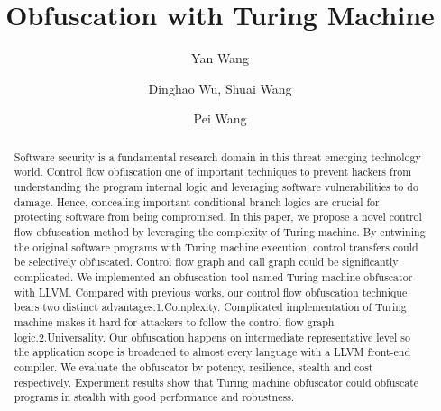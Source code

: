 \documentclass[lnicst]{svmultln}
\begin{document}
%
\mainmatter              %
%
\title{Obfuscation with Turing Machine}
%
%
\author{Yan Wang \and Dinghao Wu,
Shuai Wang \and Pei Wang}
%
%
%
\institute{Pennsylvania State University, State College,PA 16801, USA,\\
\email{ybw5084@ist.psu.edu} %
}
\maketitle              

\begin{abstract}        %
Software security is a fundamental research domain in this threat emerging technology world. Control flow obfuscation one of important techniques to prevent hackers from understanding the program internal logic and leveraging software vulnerabilities to do damage. Hence, concealing important conditional branch logics are crucial for protecting software from being compromised. In this paper, we propose a novel control flow obfuscation method by leveraging the complexity of Turing machine. By entwining the original software programs with Turing machine execution, control transfers could be selectively obfuscated. Control flow graph and call graph could be significantly complicated. We implemented an obfuscation tool named Turing machine obfuscator with LLVM. Compared with previous works, our control flow obfuscation technique bears two distinct advantages:1.Complexity. Complicated implementation of Turing machine makes it hard for attackers to follow the control flow graph logic.2.Universality. Our obfuscation happens on intermediate representative level so the application scope is broadened to almost every language with a LLVM front-end compiler.  We evaluate the obfuscator by potency, resilience, stealth and cost respectively. Experiment results show that Turing machine obfuscator could obfuscate programs in stealth with good performance and robustness. 
\end{abstract}
%
\end{document}
